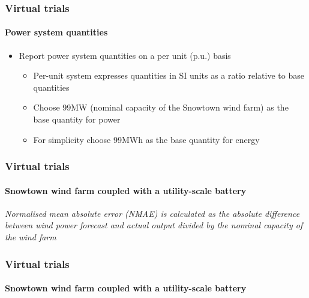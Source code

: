 \documentclass[presentation, smaller, table, svgnames]{beamer}
\begin{document}
\begin{frame}
	\frametitle{Virtual trials}
	\framesubtitle{Power system quantities}

	\begin{itemize}
		\item  Report power system quantities on a per unit (p.u.) basis
		\begin{itemize}
			\item  Per-unit system expresses quantities in SI units as a ratio relative to base quantities
			\item  Choose 99MW (nominal capacity of the Snowtown wind farm) as the base quantity for power   
			\item  For simplicity choose 99MWh as the base quantity for energy
		\end{itemize}
				
	\end{itemize}
	
\end{frame}


\begin{frame}
	\frametitle{Virtual trials}
	\framesubtitle{Snowtown wind farm coupled with a utility-scale battery}

	\begin{figure}[!h]
		\centering
    		\label{fig:disp_wind_bess}
		\scalebox{0.67}{
			
		}
	\end{figure}
	
	{\scriptsize \textit{Normalised mean absolute error (NMAE) is calculated as the absolute difference between wind power forecast and actual output divided by the nominal capacity of the wind farm}
	\par
	}

\end{frame}

\begin{frame}
	\frametitle{Virtual trials}
	\framesubtitle{Snowtown wind farm coupled with a utility-scale battery}

	\begin{figure}[!h]
		\centering
    		\label{fig:disp_wind_bess}
		\scalebox{0.75}{
			
		}
	\end{figure}

\end{frame}
\end{document}
